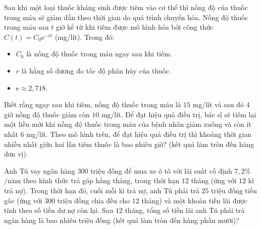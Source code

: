 \begin{ex}%
	Sau khi một loại thuốc kháng sinh được tiêm vào cơ thể thì nồng độ của thuốc trong máu sẽ giảm dần theo thời gian do quá trình chuyển hóa. Nồng độ thuốc trong máu sau $t$ giờ kể từ khi tiêm được mô hình hóa bởi công thức $C(t)=C_0\mathrm{e}^{-rt}$ (mg/lít). Trong đó:
	\begin{itemize}
		\item $C_0$ là nồng độ thuốc trong máu ngay sau khi tiêm.
		\item $r$ là hằng số dương đo tốc độ phân hủy của thuốc.
		\item $\mathrm{e} \approx 2{,}718$.
	\end{itemize}
	Biết rằng ngay sau khi tiêm, nồng độ thuốc trong máu là $15$ mg/lít và sau đó $4$ giờ nồng độ thuốc giảm còn $10$ mg/lít. Để đạt hiệu quả điều trị, bác sĩ sẽ tiêm lại một liều mới khi nồng độ thuốc trong máu của bệnh nhân giảm xuống và còn ít nhất $6$ mg/lít. Theo mô hình trên, để đạt hiệu quả điều trị thì khoảng thời gian nhiều nhất giữa hai lần tiêm thuốc là bao nhiêu giờ? (kết quả làm tròn đến hàng đơn vị).
\end{ex}

\begin{ex}%
	Anh Tú vay ngân hàng $300$ triệu đồng để mua xe ô tô với lãi suất cố định $7{,}2\%$/năm theo hình thức trả góp hằng tháng, trong thời hạn $12$ tháng (ứng với $12$ kì trả nợ). Trong thời hạn đó, cuối mỗi kì trả nợ, anh Tú phải trả $25$ triệu đồng tiền gốc (ứng với $300$ triệu đồng chia đều cho $12$ tháng) và một khoản tiền lãi được tính theo số tiền dư nợ còn lại. Sau $12$ tháng, tổng số tiền lãi anh Tú phải trả ngân hàng là bao nhiêu triệu đồng (kết quả làm tròn đến hàng phần mười)?
\end{ex}

